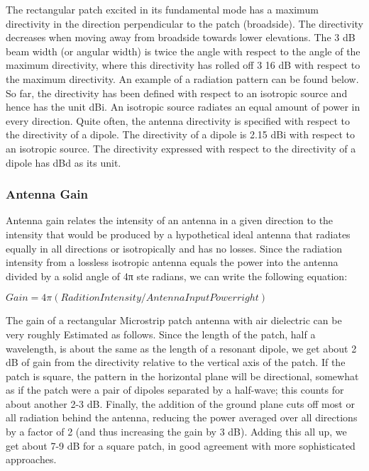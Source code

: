 \documentclass[12pt]{article}
\begin{document}
         The rectangular patch excited in its fundamental mode has a maximum directivity in the direction perpendicular to the patch (broadside). The directivity decreases when moving away from broadside towards lower elevations. The 3 dB beam width (or angular width) is twice the angle with respect to the angle of the maximum directivity, where this directivity has rolled off 3 16 dB with respect to the maximum directivity. An example of a radiation pattern can be found below. So far, the directivity has been defined with respect to an isotropic source and hence has the unit dBi. An isotropic source radiates an equal amount of power in every direction. Quite often, the antenna directivity is specified with respect to the directivity of a dipole. The  directivity of a dipole is 2.15 dBi with respect to an isotropic source. The directivity expressed with respect to the directivity of a dipole has dBd as its unit.

        \subsubsection{Antenna Gain}
         \justify

	        Antenna gain relates the intensity of an antenna in a given direction to the intensity that would be produced by a hypothetical ideal antenna that radiates equally in all directions or isotropically and has no losses. Since the radiation intensity from a lossless isotropic antenna equals the power into the antenna divided by a solid angle of 4π ste radians, we can write the following equation:\newline \newline

	        $ Gain= 4 \pi (Radition Intensity / Antenna InputPower right ) $
			\newline \newline

	        The gain of a rectangular Microstrip patch antenna with air dielectric can be very roughly Estimated as follows. Since the length of the patch, half a wavelength, is about the same as the length of a resonant dipole, we get about 2 dB of gain from the directivity relative to the vertical axis of the patch. If the patch is square, the pattern in the horizontal plane will be directional, somewhat as if the patch were a pair of dipoles separated by a half-wave; this counts for about another 2-3 dB. Finally, the addition of the ground plane cuts off most or all radiation behind the antenna, reducing the power averaged over all directions by a factor of 2 (and thus increasing the gain by 3 dB). Adding this all up, we get about 7-9 dB for a square patch, in good agreement with more sophisticated approaches.
\end{document}
